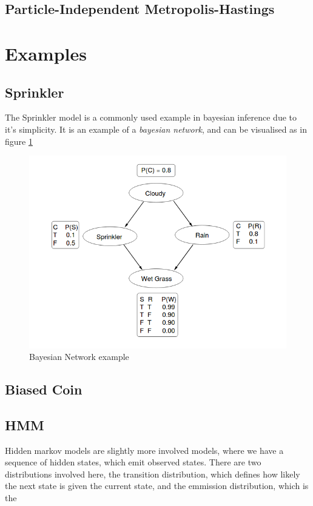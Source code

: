 \subsection{Particle-Independent Metropolis-Hastings} \label{sec:pimh}

\section{Examples}

\subsection{Sprinkler}
The Sprinkler model is a commonly used example in bayesian inference due to it's simplicity. It is an example of a \textit{bayesian network}, and can be visualised as in figure \ref{fig:sprinkler-network}

\begin{figure}[!htb]
    \centering
    \includegraphics[width=\textwidth]{figs/sprinkler-network.png}
    \caption{Bayesian Network example}
    \label{fig:sprinkler-network}
\end{figure}

\subsection{Biased Coin}

\subsection{HMM}
Hidden markov models are slightly more involved models, where we have a sequence of hidden states, which emit observed states. There are two distributions involved here, the transition distribution, which defines how likely the next state is given the current state, and the emmission distribution, which is the 


